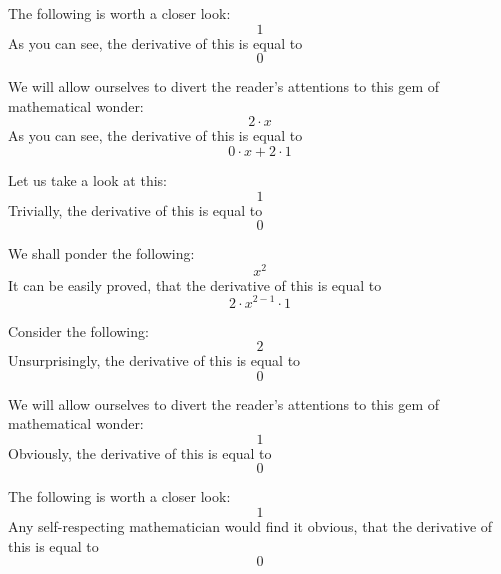 \documentclass{article}
\begin{document}
The following is worth a closer look:
\begin{equation}
1 
\end{equation}
As you can see, the derivative of this is equal to
\begin{equation}
0 
\end{equation}

We will allow ourselves to divert the reader's attentions to this gem of mathematical wonder:
\begin{equation}
2 \cdot x 
\end{equation}
As you can see, the derivative of this is equal to
\begin{equation}
0 \cdot x + 2 \cdot 1 
\end{equation}

Let us take a look at this:
\begin{equation}
1 
\end{equation}
Trivially, the derivative of this is equal to
\begin{equation}
0 
\end{equation}

We shall ponder the following:
\begin{equation}
x ^{2 } 
\end{equation}
It can be easily proved, that the derivative of this is equal to
\begin{equation}
2 \cdot x ^{2 - 1 } \cdot 1 
\end{equation}

Consider the following:
\begin{equation}
2 
\end{equation}
Unsurprisingly, the derivative of this is equal to
\begin{equation}
0 
\end{equation}

We will allow ourselves to divert the reader's attentions to this gem of mathematical wonder:
\begin{equation}
1 
\end{equation}
Obviously, the derivative of this is equal to
\begin{equation}
0 
\end{equation}

The following is worth a closer look:
\begin{equation}
1 
\end{equation}
Any self-respecting mathematician would find it obvious, that the derivative of this is equal to
\begin{equation}
0 
\end{equation}
\end{document}
